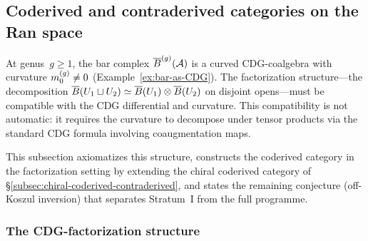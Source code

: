 \subsection{Coderived and contraderived categories on the Ran space}
\label{subsec:coderived-ran-formalism}

At genus~$g \geq 1$, the bar complex $\overline{B}^{(g)}(\mathcal{A})$ is a
curved CDG-coalgebra with curvature $m_0^{(g)} \neq 0$
(Example~\ref{ex:bar-as-CDG}).  The factorization structure---the
decomposition
$\overline{B}(U_1 \sqcup U_2) \simeq \overline{B}(U_1) \otimes \overline{B}(U_2)$
on disjoint opens---must be compatible with the CDG differential
and curvature.  This compatibility is not automatic: it requires
the curvature to decompose under tensor products via the standard
CDG formula involving coaugmentation maps.

This subsection axiomatizes this structure, constructs the coderived
category in the factorization setting by extending the chiral
coderived category of
\S\ref{subsec:chiral-coderived-contraderived}, and states
the remaining conjecture (off-Koszul inversion) that separates
Stratum~I from the full programme.

\subsubsection*{The CDG-factorization structure}

